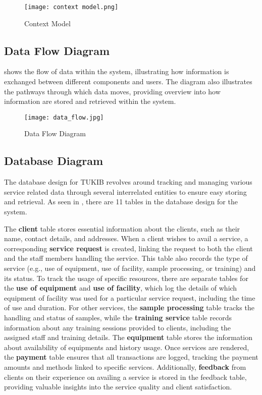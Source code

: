 \begin{figure}[h]
	\centering 
	\texttt{[image: context model.png]}
	\caption{Context Model}
	\label{fig:context_model}
\end{figure}

\newpage

\subsection{Data Flow Diagram}

 shows the flow of data within the system, illustrating how information is exchanged between different components and users. The diagram also illustrates the pathways through which data moves, providing overview into how information are stored and retrieved within the system.

\begin{figure}[h]
	\centering 
	\texttt{[image: data\_flow.jpg]}
	\caption{Data Flow Diagram}
	\label{fig:data_flow}
\end{figure}

\newpage

\subsection{Database Diagram}

The database design for TUKIB revolves around tracking and managing various service related data through several interrelated entities to ensure easy storing and retrieval. As seen in , there are 11 tables in the database design for the system. 

The \textbf{client} table stores essential information about the clients, such as their name, contact details, and addresses. When a client wishes to avail a service, a corresponding \textbf{service request} is created, linking the request to both the client and the staff members handling the service. This table also records the type of service (e.g., use of equipment, use of facility, sample processing, or training) and its status. To track the usage of specific resources, there are separate tables for the \textbf{use of equipment} and \textbf{use of facility}, which log the details of which equipment of facility was used for a particular service request, including the time of use and duration. For other services, the \textbf{sample processing} table tracks the handling and status of samples, while the \textbf{training service} table records information about any training sessions provided to clients, including the assigned staff and training details. The \textbf{equipment} table stores the information about availability of equipments and history usage. Once services are rendered, the \textbf{payment} table ensures that all transactions are logged, tracking the payment amounts and methods linked to specific services. Additionally, \textbf{feedback} from clients on their experience on availing a service is stored in the feedback table, providing valuable insights into the service quality and client satisfaction.

